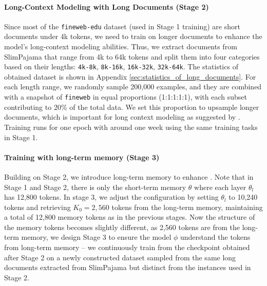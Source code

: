 \vspace{-10pt}
\paragraph{Long-Context Modeling with Long Documents (Stage 2)}
Since most of the \texttt{fineweb-edu} dataset (used in Stage 1 training) are short documents under 4k tokens, we need to train on longer documents to enhance the model's long-context modeling abilities. Thus, we extract documents from SlimPajama that range from 4k to 64k tokens and split them into four categories based on their lengths: \texttt{4k-8k}, \texttt{8k-16k}, \texttt{16k-32k}, \texttt{32k-64k}. The statistics of obtained dataset is shown in Appendix \ref{sec:statistics_of_long_documents}. For each length range, we randomly sample 200,000 examples, and they are combined with a snapshot of \texttt{fineweb} in equal proportions (1:1:1:1:1), with each subset contributing to 20\% of the total data. We set this proportion to upsample longer documents, which is important for long context modeling as suggested by \citet{data_engineering_for_longcontext}.
Training runs for one epoch with around one week using the same training tasks in Stage 1. 

\vspace{-10pt}
\paragraph{Training with long-term memory (Stage 3)}  
Building on Stage 2, we introduce long-term memory to enhance \ours. Note that in Stage 1 and Stage 2, there is only the short-term memory $\theta$ where each layer $\theta_l$ has 12,800 tokens. In stage 3, we adjust the configuration by setting $\theta_l$  to 10,240 tokens and retrieving $K_0=2,560$ tokens from the long-term memory, maintaining a total of 12,800 memory tokens as in the previous stages.
Now the structure of the memory tokens becomes slightly different, as 2,560 tokens are from the long-term memory, we design Stage 3 to ensure the model $\phi$ understand the tokens from long-term memory -- we continuously train from the checkpoint obtained after Stage 2 on a newly constructed dataset sampled from the same long documents extracted from SlimPajama but distinct from the instances used in Stage 2.

